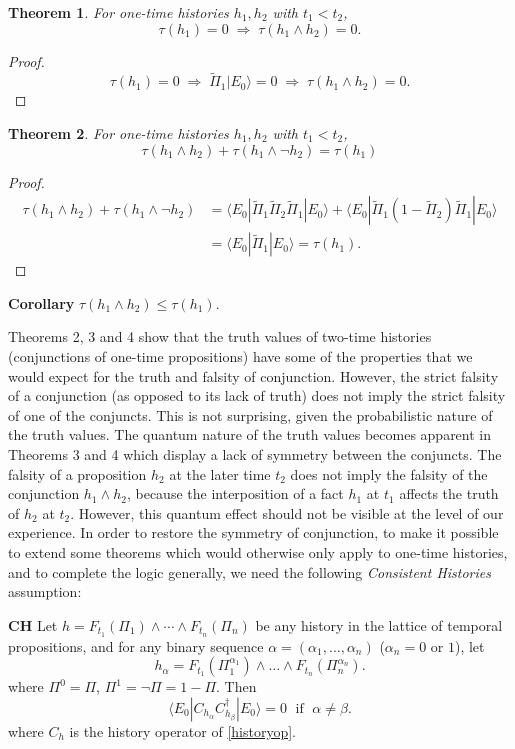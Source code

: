 \documentclass[12pt,reqno]{article}
\newcommand{\linespace}{\vspace{\baselineskip}}
\renewcommand{\(}{\left(}
\renewcommand{\)}{\right)}
\newcommand{\<}{\langle}
\renewcommand{\>}{\rangle}
\newcommand{\impl}{\Longrightarrow}
\newcommand{\Pii}{\widetilde{\Pi}}
\theoremstyle{plain} %
\newtheorem{thm}{Theorem}
\begin{document}
\begin{thm} For one-time histories $h_1,h_2$ with $t_1 < t_2$,
\[
\tau(h_1) = 0 \; \impl\; \tau(h_1\land h_2) = 0.
\]
\end{thm}
\begin{proof}
\[
\tau(h_1) = 0 \;\impl\; \Pii_1|E_0\> = 0 \;\impl\; \tau(h_1\land h_2) = 0.
\]
\end{proof}

\begin{thm} For one-time histories $h_1,h_2$ with $t_1<t_2$,
\[
\tau(h_1\land h_2) + \tau(h_1\land\lnot h_2) = \tau(h_1)
\]
\end{thm}
\begin{proof}
\begin{align*}
\tau(h_1\land h_2) + \tau(h_1\land\lnot h_2) &= \<E_0|\Pii_1\Pii_2\Pii_1|E_0\> +  \<E_0|\Pii_1\(1 - \Pii_2\)\Pii_1|E_0\>\\
&= \<E_0|\Pii_1|E_0\> = \tau(h_1).
\end{align*}
\end{proof}
{\bf Corollary} $\tau(h_1\land h_2) \leq \tau(h_1)$.

\linespace

Theorems 2, 3 and 4 show that the truth values of two-time histories (conjunctions of one-time propositions) have some of the properties that we would expect for the truth and falsity of conjunction. However, the strict falsity of a conjunction (as opposed to its lack of truth) does not imply the strict falsity of one of the conjuncts. This is not surprising, given the probabilistic nature of the truth values. The quantum nature of the truth values becomes apparent in Theorems 3 and 4
which display a lack of symmetry between the conjuncts. The falsity of a proposition $h_2$ at the later time $t_2$ does not imply the falsity of the conjunction $h_1\land h_2$, because the interposition of a fact $h_1$ at $t_1$ affects the truth of $h_2$ at $t_2$. However, this quantum effect should not be visible at the level of our experience. In order to restore the symmetry of conjunction, to make it possible to extend some theorems which would otherwise only apply to one-time histories, and to complete the logic generally, we need the following \emph{Consistent Histories} assumption:

{\bf CH}\hspace{0.5em} Let $h = F_{t_1}(\Pi_1)\land \cdots \land F_{t_n}(\Pi_n)$ be any history in the lattice of temporal propositions, and for any binary sequence $\alpha = (\alpha_1,\ldots ,\alpha_n)$ ($\alpha_n = 0$ or $1$), let
\[
h_\alpha = F_{t_1}(\Pi_1^{\alpha_1})\land \ldots \land F_{t_n}(\Pi_n^{\alpha_n}).
\]
where $\Pi^0 = \Pi$, $\Pi^1 = \lnot\Pi = 1 - \Pi$. Then
\[
\<E_0|C_{h_\alpha} C_{h_\beta}^\dagger|E_0\> = 0 \;\text{ if }\; \alpha \neq \beta.
\]
where $C_h$ is the history operator of \eqref{historyop}.
\end{document}
